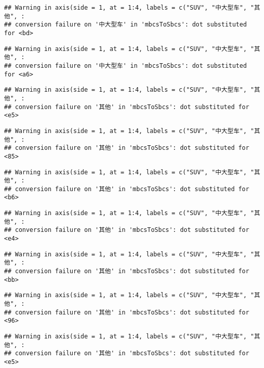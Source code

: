 \documentclass[]{article}
\begin{document}
\begin{verbatim}
## Warning in axis(side = 1, at = 1:4, labels = c("SUV", "中大型车", "其他", :
## conversion failure on '中大型车' in 'mbcsToSbcs': dot substituted for <bd>
\end{verbatim}

\begin{verbatim}
## Warning in axis(side = 1, at = 1:4, labels = c("SUV", "中大型车", "其他", :
## conversion failure on '中大型车' in 'mbcsToSbcs': dot substituted for <a6>
\end{verbatim}

\begin{verbatim}
## Warning in axis(side = 1, at = 1:4, labels = c("SUV", "中大型车", "其他", :
## conversion failure on '其他' in 'mbcsToSbcs': dot substituted for <e5>
\end{verbatim}

\begin{verbatim}
## Warning in axis(side = 1, at = 1:4, labels = c("SUV", "中大型车", "其他", :
## conversion failure on '其他' in 'mbcsToSbcs': dot substituted for <85>
\end{verbatim}

\begin{verbatim}
## Warning in axis(side = 1, at = 1:4, labels = c("SUV", "中大型车", "其他", :
## conversion failure on '其他' in 'mbcsToSbcs': dot substituted for <b6>
\end{verbatim}

\begin{verbatim}
## Warning in axis(side = 1, at = 1:4, labels = c("SUV", "中大型车", "其他", :
## conversion failure on '其他' in 'mbcsToSbcs': dot substituted for <e4>
\end{verbatim}

\begin{verbatim}
## Warning in axis(side = 1, at = 1:4, labels = c("SUV", "中大型车", "其他", :
## conversion failure on '其他' in 'mbcsToSbcs': dot substituted for <bb>
\end{verbatim}

\begin{verbatim}
## Warning in axis(side = 1, at = 1:4, labels = c("SUV", "中大型车", "其他", :
## conversion failure on '其他' in 'mbcsToSbcs': dot substituted for <96>
\end{verbatim}

\begin{verbatim}
## Warning in axis(side = 1, at = 1:4, labels = c("SUV", "中大型车", "其他", :
## conversion failure on '其他' in 'mbcsToSbcs': dot substituted for <e5>
\end{verbatim}
\end{document}
